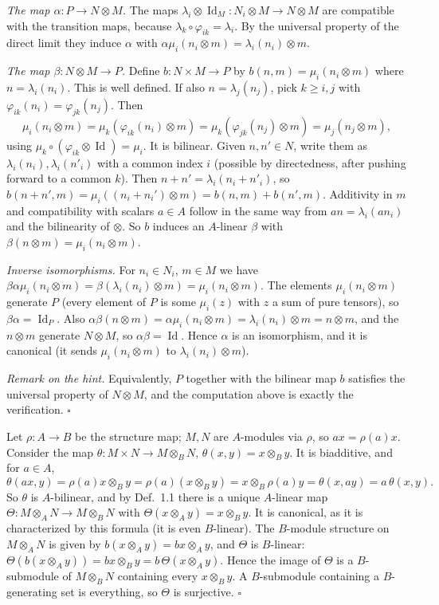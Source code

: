 \documentclass[11pt]{article}
\begin{document}
\emph{The map $\alpha:P\to N\otimes M$.} The maps $\lambda_i\otimes\operatorname{Id}_M:N_i\otimes M\to N\otimes M$ are compatible with the transition maps, because $\lambda_k\circ\varphi_{ik}=\lambda_i$. By the universal property of the direct limit they induce $\alpha$ with $\alpha\mu_i(n_i\otimes m)=\lambda_i(n_i)\otimes m$.

\emph{The map $\beta:N\otimes M\to P$.} Define $b:N\times M\to P$ by $b(n,m)=\mu_i(n_i\otimes m)$ where $n=\lambda_i(n_i)$. This is well defined. If also $n=\lambda_j(n_j)$, pick $k\ge i,j$ with $\varphi_{ik}(n_i)=\varphi_{jk}(n_j)$. Then
\[ \mu_i(n_i\otimes m)=\mu_k(\varphi_{ik}(n_i)\otimes m)=\mu_k(\varphi_{jk}(n_j)\otimes m)=\mu_j(n_j\otimes m), \]
using $\mu_k\circ(\varphi_{ik}\otimes\operatorname{Id})=\mu_i$. It is bilinear. Given $n,n'\in N$, write them as $\lambda_i(n_i),\lambda_i(n'_i)$ with a common index $i$ (possible by directedness, after pushing forward to a common $k$). Then $n+n'=\lambda_i(n_i+n'_i)$, so $b(n+n',m)=\mu_i((n_i+n_i')\otimes m)=b(n,m)+b(n',m)$. Additivity in $m$ and compatibility with scalars $a\in A$ follow in the same way from $a n=\lambda_i(an_i)$ and the bilinearity of $\otimes$. So $b$ induces an $A$-linear $\beta$ with $\beta(n\otimes m)=\mu_i(n_i\otimes m)$.

\emph{Inverse isomorphisms.} For $n_i\in N_i$, $m\in M$ we have $\beta\alpha\mu_i(n_i\otimes m)=\beta(\lambda_i(n_i)\otimes m)=\mu_i(n_i\otimes m)$. The elements $\mu_i(n_i\otimes m)$ generate $P$ (every element of $P$ is some $\mu_i(z)$ with $z$ a sum of pure tensors), so $\beta\alpha=\operatorname{Id}_P$. Also $\alpha\beta(n\otimes m)=\alpha\mu_i(n_i\otimes m)=\lambda_i(n_i)\otimes m=n\otimes m$, and the $n\otimes m$ generate $N\otimes M$, so $\alpha\beta=\operatorname{Id}$. Hence $\alpha$ is an isomorphism, and it is canonical (it sends $\mu_i(n_i\otimes m)$ to $\lambda_i(n_i)\otimes m$).

\emph{Remark on the hint.} Equivalently, $P$ together with the bilinear map $b$ satisfies the universal property of $N\otimes M$, and the computation above is exactly the verification. \hfill$\square$

\pf
Let $\rho:A\to B$ be the structure map; $M,N$ are $A$-modules via $\rho$, so $ax=\rho(a)x$. Consider the map $\theta:M\times N\to M\otimes_BN$, $\theta(x,y)=x\otimes_By$. It is biadditive, and for $a\in A$,
\[ \theta(ax,y)=\rho(a)x\otimes_By=\rho(a)(x\otimes_By)=x\otimes_B\rho(a)y=\theta(x,ay)=a\,\theta(x,y). \]
So $\theta$ is $A$-bilinear, and by Def.~1.1 there is a unique $A$-linear map $\Theta:M\otimes_AN\to M\otimes_BN$ with $\Theta(x\otimes_Ay)=x\otimes_By$. It is canonical, as it is characterized by this formula (it is even $B$-linear). The $B$-module structure on $M\otimes_AN$ is given by $b(x\otimes_Ay)=bx\otimes_Ay$, and $\Theta$ is $B$-linear: $\Theta(b(x\otimes_Ay))=bx\otimes_By=b\,\Theta(x\otimes_Ay)$. Hence the image of $\Theta$ is a $B$-submodule of $M\otimes_BN$ containing every $x\otimes_By$. A $B$-submodule containing a $B$-generating set is everything, so $\Theta$ is surjective. \hfill$\square$
\end{document}
